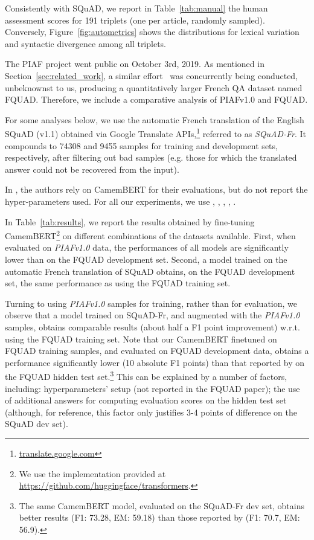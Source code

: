 \documentclass[10pt, a4paper]{article}
\begin{document}
Consistently with SQuAD, we report in Table~\ref{tab:manual}  the human assessment scores for 191 triplets (one per article, randomly sampled). Conversely, Figure~\ref{fig:autometrics} shows the distributions for lexical variation and syntactic divergence among all triplets.

The PIAF project went public on October 3rd, 2019. As mentioned in Section~\ref{sec:related_work}, a similar effort~\cite{d2020fquad} was concurrently being conducted, unbeknownst to us, producing a quantitatively larger French QA dataset named FQUAD. Therefore, we include a comparative analysis of PIAFv1.0 and FQUAD. 

For some analyses below, we use the automatic French translation of the English SQuAD (v1.1) obtained via Google Translate APIs,\footnote{\url{translate.google.com}} referred to as \emph{SQuAD-Fr}. It compounds to 74308 and 9455 samples for training and development sets, respectively, after filtering out bad samples (e.g. those for which the translated answer could not be recovered from the input).

In \cite{d2020fquad}, the authors rely on CamemBERT \cite{camembert} for their evaluations, but do not report the hyper-parameters used. For all our experiments, we use , , , , .

In Table~\ref{tab:results}, we report the results obtained by fine-tuning CamemBERT\footnote{We use the implementation provided at \url{https://github.com/huggingface/transformers}.} on different combinations of the datasets available. First, when evaluated on \emph{PIAFv1.0} data, the performances of all models are significantly lower than on the FQUAD development set. Second, a model trained on the automatic French translation of SQuAD obtains, on the FQUAD development set, the same performance as using the FQUAD training set. 

Turning to using \emph{PIAFv1.0} samples for training, rather than for evaluation, we observe that a model trained on SQuAD-Fr, and augmented with the \emph{PIAFv1.0} samples, obtains comparable results (about half a F1 point improvement) w.r.t. using the FQUAD training set. Note that our CamemBERT finetuned on FQUAD training samples, and evaluated on FQUAD development data, obtains a performance significantly lower (10 absolute F1 points) than that reported by \cite{d2020fquad} on the FQUAD hidden test set.\footnote{The same CamemBERT model, evaluated on the SQuAD-Fr dev set, obtains better results (F1: 73.28, EM: 59.18) than those reported by \cite{d2020fquad} (F1: 70.7, EM: 56.9).} This can be explained by a number of factors, including: hyperparameters' setup (not reported in the FQUAD paper); the use of additional answers for computing evaluation scores on the hidden test set (although, for reference, this factor only justifies 3-4 points of difference on the SQuAD dev set). 
\end{document}
